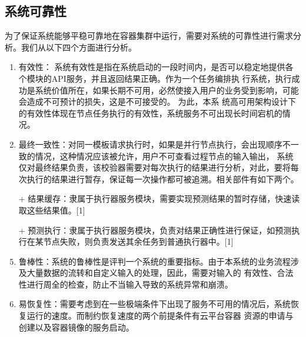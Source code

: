 \subsection{系统可靠性}
为了保证系统能够平稳可靠地在容器集群中运行，需要对系统的可靠性进行需求分析。我们从以下四个方面进行分析。
\begin{enumerate}
    \item 有效性： 系统有效性是指在系统启动的一段时间内，是否可以稳定地提供各个模块的API服务，并且返回结果正确。作为一个任务编排执
行系统，执行成功是系统价值所在，如果长期不可用，必然使接入用户的业务受到影响，可能会造成不可预计的损失，这是不可接受的。 为此，本系
统高可用架构设计下的有效性体现在节点任务执行的有效性，系统服务不可出现长时间宕机的情况。
    \item 最终一致性：对同一模板请求执行时，如果是并行节点执行，会出现顺序不一致的情况，这种情况应该被允许，用户不可查看过程节点的输入输出，
系统仅对最终结果负责，该校验器需要对每次执行的结果进行分析，对此，要将每次执行的结果进行暂存，保证每一次操作都可被追溯。相关部件有如下两个。
    \item[+] 结果缓存：隶属于执行器服务模块，需要实现预测结果的暂时存储，快速读取这些结果值。[1]
    \item[+] 预测执行：隶属于执行器服务模块，负责对结果正确性进行保证，如预测执行在某节点失败，则负责发送其余任务到普通执行器中。[1]
    \item 鲁棒性：系统的鲁棒性是评判一个系统的重要指标。由于本系统的业务流程涉及大量数据的流转和自定义输入的处理，因此，需要对输入的
有效性、合法性进行周全的检查，防止不当输入导致的系统异常和崩溃。
    \item 易恢复性：需要考虑到在一些极端条件下出现了服务不可用的情况后，系统恢复运行的速度。而制约恢复速度的两个前提条件有云平台容器
资源的申请与创建以及容器镜像的服务启动。
\end{enumerate}


%
%
%

